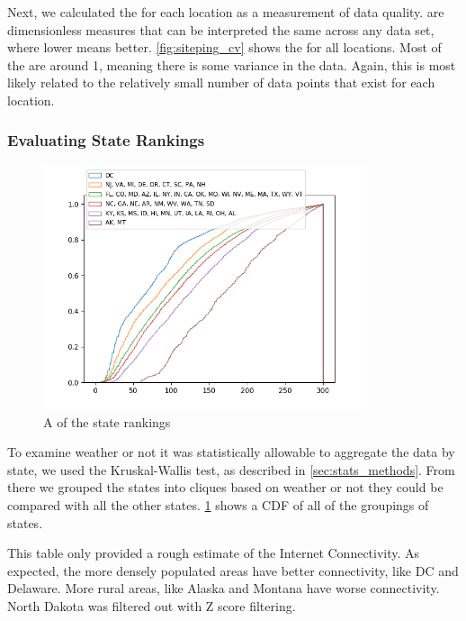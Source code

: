 Next, we calculated the \cv for each location as a measurement of data quality. \CVs are dimensionless measures that can be interpreted the same across any data set, where lower means better. \cref{fig:siteping_cv} shows the \cvs for all locations. Most of the \cvs are around 1, meaning there is some variance in the data. Again, this is most likely related to the relatively small number of data points that exist for each location.

\subsubsection{Evaluating State Rankings}

\begin{figure}[H]
    \centering
    \includegraphics[width=0.85\textwidth]{images/siteping/siteping_clusters_cdf.png}
    \caption{A \cdf of the state rankings}
    \label{fig:siteping_cdf}
\end{figure}

To examine weather or not it was statistically allowable to aggregate the data by state, we used the Kruskal-Wallis test, as described in \cref{sec:stats_methods}. From there we grouped the states into cliques based on weather or not they could be compared with all the other states. \cref{fig:siteping_cdf} shows a CDF of all of the groupings of states.

 

This table only provided a rough estimate of the Internet Connectivity. As expected, the more densely populated areas have better connectivity, like DC and Delaware. More rural areas, like Alaska and Montana have worse connectivity. North Dakota was filtered out with Z score filtering.

